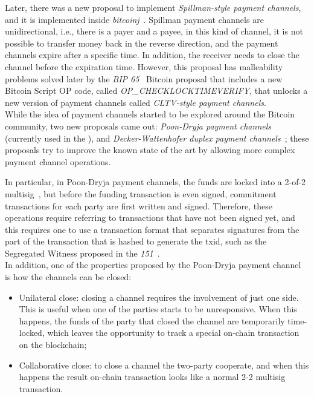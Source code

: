 Later, there was a new proposal to implement  \emph{Spillman-style payment channels}, and it is
implemented inside  \emph{bitcoinj}~\cite{bitcoinj-impl}. Spillman payment channels are unidirectional, i.e., 
there is a payer and a payee, in this kind of channel, it is not possible to transfer money back in the reverse direction, and the payment
channels expire after a specific time.
In addition, the receiver needs to close the channel before the expiration time.
However, this proposal has malleability problems solved later by the \emph{BIP  65}~\cite{bip65} Bitcoin proposal that includes a new Bitcoin Script OP code,
called \emph{OP\_CHECKLOCKTIMEVERIFY}, that unlocks a new version of payment channels called \emph{CLTV-style payment channels}.\\
While the idea of payment channels started to be explored around the Bitcoin community, two new proposals came out:
\emph{Poon-Dryja payment channels}~\cite{lightning-network-paper} (currently used in the {\LN}),
and \emph{Decker-Wattenhofer duplex payment channels}~\cite{Decker2015fast}; these proposals try to improve the known state
of the art by allowing more complex payment channel operations.

In particular, in Poon-Dryja payment channels, the funds are locked into a 2-of-2 multisig~\cite{Palazzo_Estrazione_di_Informazioni_2021},
but before the funding transaction is even signed, commitment transactions for each party are first written and signed.
Therefore, these operations require referring to transactions that have not been signed yet, and this requires one to use a transaction
 format that separates signatures from the part of the transaction that is hashed to generate the txid, such as the Segregated Witness proposed  in the \emph{151}~\cite{bip141}.\\
In addition, one of the properties proposed by the Poon-Dryja payment channel is how the channels can be closed:

\begin{itemize}
  \item Unilateral close: closing a channel requires the involvement of just one side. This is useful when one
        of the parties starts to be unresponsive. When this happens, the funds of
        the party that closed the channel are temporarily time-locked, which leaves the opportunity to
        track a special on-chain transaction on the blockchain;
  \item Collaborative close: to close a channel the two-party cooperate, and when this happens the result
        on-chain transaction looks like a normal 2-2 multisig transaction.
\end{itemize}

